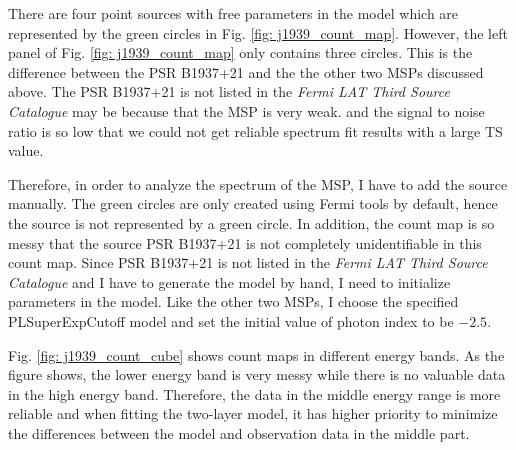\documentclass[12pt]{report}
\begin{document}
          There are four point sources with free parameters in the model which are represented 
          by the green circles in Fig. \ref{fig: j1939_count_map}.
          However, the left panel of Fig. \ref{fig: j1939_count_map} only contains three 
          circles. This is the difference between the PSR B1937+21 and the the other two MSPs 
          discussed above. The PSR B1937+21 is not listed in the 
          \textit{Fermi LAT Third Source Catalogue} may be because that the MSP is very weak.
          and the signal to noise ratio is so low that we could not get reliable spectrum fit 
          results with a large TS value. 

          Therefore, in order to analyze the spectrum of the MSP, I have to add the source 
          manually. The green circles are only created using Fermi tools by default, hence 
          the source is not represented by a green circle. In addition, the count map is so 
          messy that the source PSR B1937+21 is not completely unidentifiable in this count map. 
          Since PSR B1937+21 is not listed in the \textit{Fermi LAT Third Source Catalogue} 
          and I have to generate the model by hand, I need to initialize parameters in the 
          model. Like the other two MSPs, I choose the specified PLSuperExpCutoff model and 
          set the initial value of photon index to be $-2.5$.

          Fig. \ref{fig: j1939_count_cube} shows count maps in different energy bands. As 
          the figure shows, the lower energy band is very messy while there is no valuable  
          data in the high energy band. Therefore, the data in the middle energy range is 
          more reliable and when fitting the two-layer model, it has higher priority to 
          minimize the differences between the model and observation data in the middle part.
\end{document}
